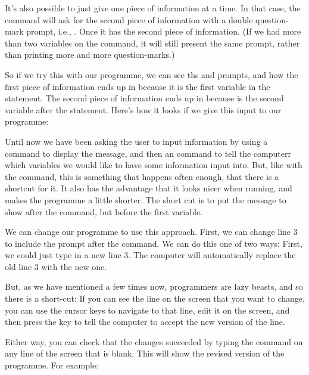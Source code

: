 It's also possible to just give one piece of information at a time.
In that case, the  command will ask for the second piece
of information with a double question-mark prompt, i.e., .
Once it has the second piece of information.  (If we had more than
two variables on the  command, it will still present the
same  prompt, rather than printing more and more
question-marks.)

\needspace{4cm}
So if we try this with our programme, we can see ths  and
 prompts, and how the first piece of information ends up in
 because it is the first variable in the 
statement.
The second piece of information ends up in  because  is
the second variable after the  statement. Here's how it
looks if we give this input to our programme:

  

Until now we have been asking the user to input information by using a
 command to display the message, and then an 
command to tell the computerr which variables we would like to have
some information input into.  But, like with the  command,
this is something that happens often enough, that there is a shortcut
for it. It also has the advantage that it looks nicer when
running, and makes the programme a little shorter. The short cut is to
put the message to show after the  command, but before the
first variable.

We can change our programme to use this approach.  First, we can
change line 3 to include the prompt after the  command.  We
can do this one of two ways: First, we could just type in a new line
3. The computer will automatically replace the old line 3 with the new
one.

But, as we have mentioned a few times now, programmers are lazy
beasts, and so there is a short-cut: If you can see the line on the
screen that you want to change, you can use the cursor keys to
navigate to that line, edit it on the screen, and then press the
 key to tell the computer to accept the new version
of the line.

\needspace{4cm}
Either way, you
can check that the changes succeeded by typing the  command
on any line of the screen that is blank.  This will show the revised
version of the programme.  For example:

